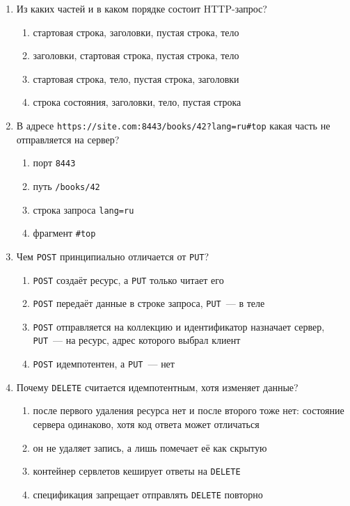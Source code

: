 \begin{enumerate}

\item Из каких частей и в каком порядке состоит HTTP-запрос?
  \begin{enumerate}
    \item[а)] стартовая строка, заголовки, пустая строка, тело
    \item[б)] заголовки, стартовая строка, пустая строка, тело
    \item[в)] стартовая строка, тело, пустая строка, заголовки
    \item[г)] строка состояния, заголовки, тело, пустая строка
  \end{enumerate}

\item В адресе \texttt{https://site.com:8443/books/42?lang=ru\#top} какая часть
      не отправляется на сервер?
  \begin{enumerate}
    \item[а)] порт \texttt{8443}
    \item[б)] путь \texttt{/books/42}
    \item[в)] строка запроса \texttt{lang=ru}
    \item[г)] фрагмент \texttt{\#top}
  \end{enumerate}

\item Чем \texttt{POST} принципиально отличается от \texttt{PUT}?
  \begin{enumerate}
    \item[а)] \texttt{POST} создаёт ресурс, а \texttt{PUT} только читает его
    \item[б)] \texttt{POST} передаёт данные в строке запроса, \texttt{PUT}~---
          в теле
    \item[в)] \texttt{POST} отправляется на коллекцию и идентификатор назначает
          сервер, \texttt{PUT}~--- на ресурс, адрес которого выбрал клиент
    \item[г)] \texttt{POST} идемпотентен, а \texttt{PUT}~--- нет
  \end{enumerate}

\item Почему \texttt{DELETE} считается идемпотентным, хотя изменяет данные?
  \begin{enumerate}
    \item[а)] после первого удаления ресурса нет и после второго тоже нет:
          состояние сервера одинаково, хотя код ответа может отличаться
    \item[б)] он не удаляет запись, а лишь помечает её как скрытую
    \item[в)] контейнер сервлетов кеширует ответы на \texttt{DELETE}
    \item[г)] спецификация запрещает отправлять \texttt{DELETE} повторно
  \end{enumerate}


\end{enumerate}
